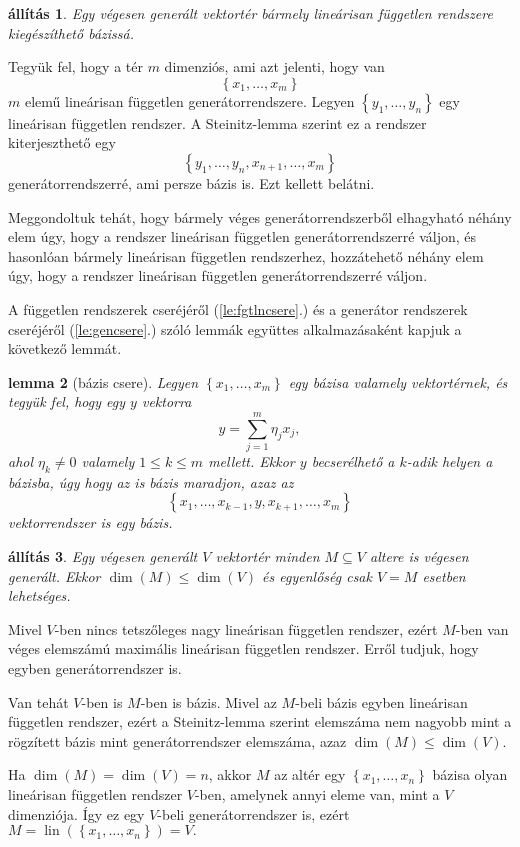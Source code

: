 \documentclass[a4paper, showtrims]{memoir}
\makeatletter
\renewenvironment{proof}[1][\proofname]
    {\par\pushQED{\qed}%
    \normalfont \topsep6\p@\@plus6\p@\relax
    \trivlist
    \item[\hskip\labelsep
        \itshape
    #1\@addpunct{:}]\ignorespaces}
    {\popQED\endtrivlist\@endpefalse}
\theoremstyle{plain}
\newtheorem{proposition}{állítás}[chapter]
\newtheorem{lemma}[proposition]{lemma}
\theoremstyle{remark}
\theoremstyle{definition}
\DeclareMathOperator{\lin}{lin}
\makeatother
\begin{document}
\begin{proposition}
	Egy végesen generált vektortér bármely lineárisan független rendszere kiegészíthető bázissá.
	\label{pr:lfgtenbazissa}
\end{proposition}
\begin{proof}
	Tegyük fel, hogy a tér $m$ dimenziós, ami azt jelenti, hogy van
	\[
		\left\{ x_1,\ldots,x_m \right\}
	\]
	$m$ elemű lineárisan független generátorrendszere.
	Legyen $\left\{ y_1,\ldots,y_n \right\}$ egy lineárisan független rendszer.
	A Steinitz-lemma szerint ez a rendszer kiterjeszthető egy
	\[
		\left\{ y_1,\ldots,y_n,x_{n+1},\ldots,x_m \right\}
	\]
	generátorrendszerré, ami persze bázis is.
	Ezt kellett belátni.
\end{proof}

Meggondoltuk tehát, hogy bármely véges generátorrendszerből elhagyható néhány elem úgy,
hogy a rendszer lineárisan független generátorrendszerré váljon,
és hasonlóan bármely lineárisan független rendszerhez, hozzátehető néhány elem úgy, hogy a
rendszer lineárisan független generátorrendszerré váljon.

A független rendszerek cseréjéről (\ref{le:fgtlncsere}.) és a generátor rendszerek cseréjéről (\ref{le:gencsere}.) szóló lemmák
együttes alkalmazásaként kapjuk a következő lemmát.

\begin{lemma}[bázis csere]\label{le:baziscsere}
	Legyen $\left\{ x_1,\ldots,x_m \right\}$ egy bázisa valamely vektortérnek,
	és tegyük fel,
	hogy egy $y$ vektorra
	\[
		y=\sum_{j=1}^m\eta_jx_j,
	\]
	ahol $\eta_k\neq 0$ valamely $1\leq k\leq m$ mellett.
	Ekkor $y$ becserélhető a $k$-adik helyen a bázisba,
	úgy hogy az is bázis maradjon, azaz az
	\[
		\left\{ x_1,\ldots,x_{k-1},y,x_{k+1},\ldots,x_m \right\}
	\]
	vektorrendszer is egy bázis.
\end{lemma}

\begin{proposition}
	Egy végesen generált $V$ vektortér minden $M\subseteq V$ altere is végesen generált.
    Ekkor $\dim(M)\leq \dim(V)$ és egyenlőség csak $V=M$ esetben lehetséges.
\end{proposition}
\begin{proof}
	Mivel $V$-ben nincs tetszőleges nagy lineárisan független rendszer,
	ezért $M$-ben van véges elemszámú maximális lineárisan független rendszer.
	Erről tudjuk, hogy egyben generátorrendszer is.

	Van tehát $V$-ben is $M$-ben is bázis.
	Mivel az $M$-beli bázis egyben lineárisan független rendszer,
	ezért a Steinitz-lemma szerint 
    elemszáma nem nagyobb mint a rögzített bázis mint generátorrendszer elemszáma,
    azaz $\dim(M)\leq \dim(V).$

    Ha $\dim(M)=\dim(V)=n$, akkor $M$ az altér egy $\left\{ x_1,\ldots,x_n \right\}$ bázisa olyan lineárisan független rendszer $V$-ben, 
    amelynek annyi eleme van, mint a $V$ dimenziója.
    Így ez egy $V$-beli generátorrendszer is, ezért 
    $M=\lin\left( \left\{ x_1,\ldots,x_n \right\}\right)=V. $
\end{proof}
\end{document}
